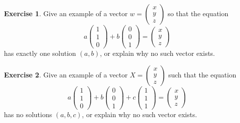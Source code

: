 \documentclass[11pt]{amsart}
\theoremstyle{definition}
\newtheorem{exercise}{Exercise}
\begin{document}
\begin{exercise}
Give an example of a vector $w = \begin{pmatrix} x \\ y \\ z \end{pmatrix}$ so that the equation
\[
a \begin{pmatrix} 1 \\ 1 \\ 0 \end{pmatrix} + b \begin{pmatrix} 0 \\ 0 \\ 1 \end{pmatrix} = \begin{pmatrix} x \\ y \\ z \end{pmatrix}
\]
has exactly one solution $(a,b)$, or explain why no such vector exists.
\end{exercise}

\begin{exercise}
Give an example of a vector $X = \begin{pmatrix} x \\ y \\ z\end{pmatrix}$ such that the equation
\[
a \begin{pmatrix} 1 \\ 1 \\ 0 \end{pmatrix} + b \begin{pmatrix} 0 \\ 0 \\ 1\end{pmatrix} + c \begin{pmatrix} 1 \\ 1 \\ 1\end{pmatrix} = \begin{pmatrix}x \\ y \\ z \end{pmatrix}
\]
has no solutions $(a,b,c)$, or explain why no such vector exists.
\end{exercise}
\end{document}
